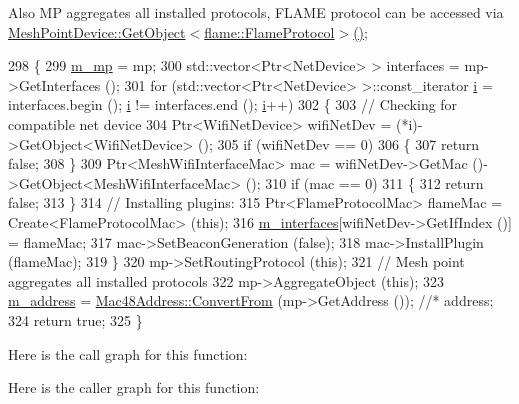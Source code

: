 Also MP aggregates all installed protocols, F\+L\+A\+ME protocol can be accessed via \hyperlink{classns3_1_1Object_a13e18c00017096c8381eb651d5bd0783}{Mesh\+Point\+Device\+::\+Get\+Object$<$flame\+::\+Flame\+Protocol$>$()}; 
\begin{DoxyCode}
298 \{
299   \hyperlink{classns3_1_1MeshL2RoutingProtocol_af4ebb2340b72dfc607ddf3c1ae65b54a}{m\_mp} = mp;
300   std::vector<Ptr<NetDevice> > interfaces = mp->GetInterfaces ();
301   \textcolor{keywordflow}{for} (std::vector<Ptr<NetDevice> >::const\_iterator \hyperlink{bernuolliDistribution_8m_a6f6ccfcf58b31cb6412107d9d5281426}{i} = interfaces.begin (); \hyperlink{bernuolliDistribution_8m_a6f6ccfcf58b31cb6412107d9d5281426}{i} != interfaces.end (); 
      \hyperlink{bernuolliDistribution_8m_a6f6ccfcf58b31cb6412107d9d5281426}{i}++)
302     \{
303       \textcolor{comment}{// Checking for compatible net device}
304       Ptr<WifiNetDevice> wifiNetDev = (*i)->GetObject<WifiNetDevice> ();
305       \textcolor{keywordflow}{if} (wifiNetDev == 0)
306         \{
307           \textcolor{keywordflow}{return} \textcolor{keyword}{false};
308         \}
309       Ptr<MeshWifiInterfaceMac> mac = wifiNetDev->GetMac ()->GetObject<MeshWifiInterfaceMac> ();
310       \textcolor{keywordflow}{if} (mac == 0)
311         \{
312           \textcolor{keywordflow}{return} \textcolor{keyword}{false};
313         \}
314       \textcolor{comment}{// Installing plugins:}
315       Ptr<FlameProtocolMac> flameMac = Create<FlameProtocolMac> (\textcolor{keyword}{this});
316       \hyperlink{classns3_1_1flame_1_1FlameProtocol_ad8595153b7695efc169354d570625d24}{m\_interfaces}[wifiNetDev->GetIfIndex ()] = flameMac;
317       mac->SetBeaconGeneration (\textcolor{keyword}{false});
318       mac->InstallPlugin (flameMac);
319     \}
320   mp->SetRoutingProtocol (\textcolor{keyword}{this});
321   \textcolor{comment}{// Mesh point aggregates all installed protocols}
322   mp->AggregateObject (\textcolor{keyword}{this});
323   \hyperlink{classns3_1_1flame_1_1FlameProtocol_aa14edf4450c8657c9e42dde32bc82df6}{m\_address} = \hyperlink{classns3_1_1Mac48Address_a911ce13603a9ef837545a032b6523ae4}{Mac48Address::ConvertFrom} (mp->GetAddress ()); \textcolor{comment}{//* address;}
324   \textcolor{keywordflow}{return} \textcolor{keyword}{true};
325 \}
\end{DoxyCode}


Here is the call graph for this function\+:




Here is the caller graph for this function\+:


